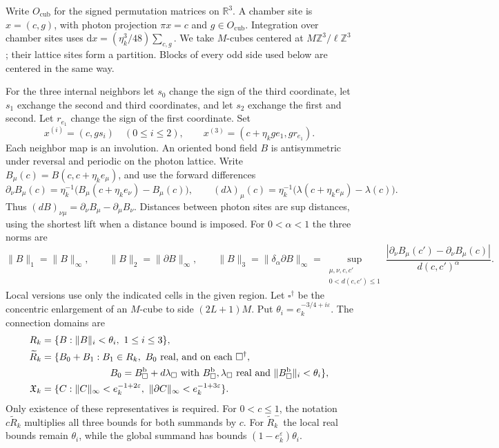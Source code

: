 \documentclass[11pt,letterpaper,reqno]{amsart}
\newcommand{\R}{\mathbb R}
\newcommand{\Z}{\mathbb Z}
\newcommand{\dd}{\mathrm d}
\begin{document}
Write \(O_{\mathrm{cub}}\) for the signed permutation matrices on
\(\R^3\). A chamber site is \(x=(c,g)\), with photon projection
\(\pi x=c\) and \(g\in O_{\mathrm{cub}}\). Integration over chamber
sites uses \(\dd x=(\eta_k^3/48)\sum_{c,g}\). We take
\(M\)-cubes centered at \(M\Z^3/\ell\Z^3\); their lattice sites
form a partition. Blocks of every odd side used below are centered
in the same way.

For the three internal neighbors let \(s_0\) change the sign of
the third coordinate, let \(s_1\) exchange the second and third
coordinates, and let \(s_2\) exchange the first and second.
Let \(r_{e_1}\) change the sign of the first coordinate. Set
\[
 x^{(i)}=(c,gs_i)\quad(0\le i\le2),\qquad
 x^{(3)}=(c+\eta_kge_1,gr_{e_1}).
\]
Each neighbor map is an involution. An oriented bond field
\(B\) is antisymmetric under reversal and periodic on the photon
lattice. Write \(B_\mu(c)=B(c,c+\eta_ke_\mu)\), and use the
forward differences
\[
 \partial_\nu B_\mu(c)=
       \eta_k^{-1}\bigl(B_\mu(c+\eta_ke_\nu)-B_\mu(c)\bigr),
 \qquad
 (d\lambda)_\mu(c)=
       \eta_k^{-1}\bigl(\lambda(c+\eta_ke_\mu)-\lambda(c)\bigr).
\]
Thus \((dB)_{\nu\mu}=\partial_\nu B_\mu-\partial_\mu B_\nu\).
Distances between photon sites are sup distances, using the
shortest lift when a distance bound is imposed. For \(0<\alpha<1\)
the three norms are
\[
 \|B\|_1=\|B\|_\infty,\qquad
 \|B\|_2=\|\partial B\|_\infty,\qquad
 \|B\|_3=\|\delta_\alpha\partial B\|_\infty
 =\sup_{\substack{\mu,\nu,c,c'\\0<d(c,c')\le1}}
 \frac{|\partial_\nu B_\mu(c')-\partial_\nu B_\mu(c)|}
      {d(c,c')^\alpha}.
\]
Local versions use only the indicated cells in the given region.
Let \(\square^\dagger\) be the concentric enlargement of an
\(M\)-cube to side \((2L+1)M\). Put
\(\theta_i=e_k^{-3/4+i\varepsilon}\).
The connection domains are
\begin{equation}\label{eq:connection-domains}
\begin{split}
 R_k&=\{B:\|B\|_i<\theta_i,\ 1\le i\le3\},\\
 \widetilde R_k&=\{B_0+B_1:B_1\in R_k,\ B_0\text{ real, and on each }
          \square^\dagger,\\
 &\hspace{25mm} B_0=B_\square^{\mathrm b}+d\lambda_\square
   \text{ with }B_\square^{\mathrm b},\lambda_\square\text{ real and }
          \|B_\square^{\mathrm b}\|_i<\theta_i\},\\
 \mathfrak X_k&=\{C:\|C\|_\infty<e_k^{-1+2\varepsilon},\
                       \|\partial C\|_\infty<e_k^{-1+3\varepsilon}\}.
\end{split}
\end{equation}
Only existence of these representatives is required.
For \(0<c\le1\), the notation \(c\widetilde R_k\) multiplies
all three bounds for both summands by \(c\).
For \(\widetilde R_k^-\) the local real bounds remain
\(\theta_i\), while the global summand has bounds
\((1-e_k^\varepsilon)\theta_i\).
\end{document}
